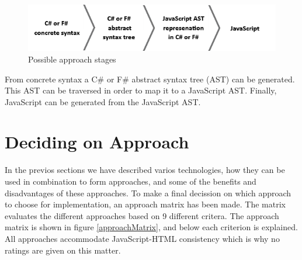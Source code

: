 				\begin{figure}[H]
			\begin{center}
				\centerline{\includegraphics[width=14cm]{resources/images/stages.png}}
			\end{center}
			\caption{Possible approach stages}
			\label{stages}
		\end{figure}

	 From concrete syntax a C\# or F\# abstract syntax tree (AST) can be generated. This AST can be traversed in order to map it to a JavaScript AST. Finally, JavaScript can be generated from the JavaScript AST.



\section{Deciding on Approach} %
\label{sec:deciding_on_approach}
	In the previos sections we have described varios technologies, how they can be used in combination to form approaches, and some of the benefits and disadvantages of these approaches. To make a final decission on which approach to choose for implementation, an approach matrix has been made. The matrix evaluates the different approaches based on 9 different critera. The approach matrix is shown in figure \ref{approachMatrix}, and below each criterion is explained. All approaches accommodate JavaScript-HTML consistency which is why no ratings are given on this matter.

